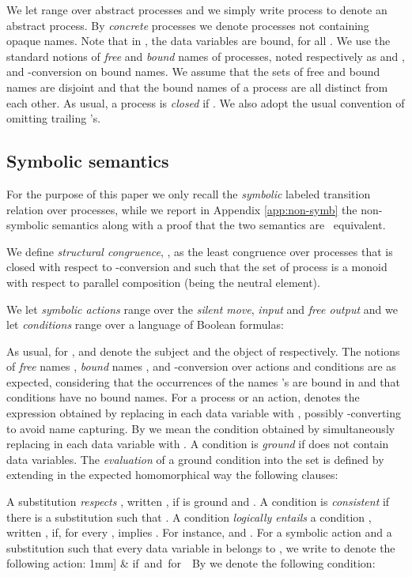 \documentclass[submission,copyright,creativecommons]{eptcs}
\newcommand{\outp}[2]{\overline{#1}\langle{#2}\rangle}
\begin{document}
We let  range over abstract processes and we simply write 
process to denote an abstract process. By \emph{concrete} processes we 
denote processes not containing opaque names. Note that in 
, the data 
variables  are bound, for all . We use the standard notions 
of {\it free} and {\it bound} names of processes, noted respectively as 
 and , and -conversion on bound names. We assume 
that the sets of free and bound names are disjoint 
and that the bound names of a process are all distinct from each other. 
As usual, a process  is {\em closed} if . We also adopt the usual convention of omitting trailing 's. 

\subsection{Symbolic semantics}
For the purpose of this paper we only recall the \emph{symbolic} labeled 
transition relation over processes, 
while we report in Appendix \ref{app:non-symb} the non-symbolic semantics along with a proof that the two semantics are \
equivalent.

We define {\em structural congruence}, , as the least
congruence over processes that is closed with respect to -conversion 
and such that the set of process is a monoid with respect to parallel 
composition  (being  the neutral element). 

We let {\em symbolic actions}  range over the {\em silent move}, 
{\em input} and {\em free output} and we let {\em conditions}  range 
over a language of Boolean formulas:

As usual, for ,  and  
denote the subject and the object of  respectively.  
The notions of {\it free} names , {\it bound} names ,
and -conversion over actions and conditions are as expected,
considering that the occurrences of the names 's are bound in
 and that conditions have no bound names.
For  a process or an action,  denotes the expression obtained
by replacing in  each data variable  with , 
possibly -converting to avoid name capturing.
By  we mean the condition obtained by simultaneously
replacing in  each data variable  with .  A
condition  is {\em ground} if  does not contain data variables.
The {\em evaluation}  of a ground condition  into the set
 is defined by extending in the expected
homomorphical way the following clauses:

A substitution  {\em respects} , written , if  is ground and . A condition 
is \emph{consistent} if there is a substitution  such that
.  A condition  {\em logically entails} a
condition , written , if, for every ,
 implies .  
For instance,  
and .  For  a symbolic 
action and  a substitution such that every data variable in 
 belongs to , we write  to 
denote the following action:
 1mm]
              \outp x {a_1,\ldots,a_k} & \mbox{if  and  for 
                }\
By  we denote the following condition:
  
\end{document}
